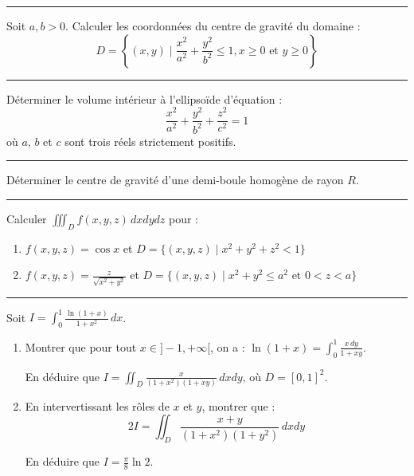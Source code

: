 \documentclass[../PolyS2.tex]{subfiles}
\begin{document}
\vspace{1em}\hrule\vspace{1em}


Soit $a, b > 0$. Calculer les coordonnées du centre de gravité du domaine :
$$D = \left\{(x,y) \mid \frac{x^2}{a^2}+\frac{y^2}{b^2} \leq 1, x \geq 0 \text{ et } y \geq 0\right\}$$

\vspace{1em}\hrule\vspace{1em}


Déterminer le volume intérieur à l'ellipsoïde d'équation :
$$\frac{x^2}{a^2}+\frac{y^2}{b^2}+\frac{z^2}{c^2} = 1$$
où $a$, $b$ et $c$ sont trois réels strictement positifs.

\vspace{1em}\hrule\vspace{1em}


Déterminer le centre de gravité d'une demi-boule homogène de rayon $R$.

\vspace{1em}\hrule\vspace{1em}


Calculer $\displaystyle\iiint_D f(x,y,z) \, dxdydz$ pour :

\begin{enumerate}
\item $f(x,y,z) = \cos x$ et $D = \{(x,y,z) \mid x^2+y^2+z^2 < 1\}$
\item $f(x,y,z) = \frac{z}{\sqrt{x^2+y^2}}$ et $D = \{(x,y,z) \mid x^2+y^2 \leq a^2 \text{ et } 0 < z < a\}$
\end{enumerate}

\vspace{1em}\hrule\vspace{1em}

\newpage 
{}

Soit $I = \displaystyle\int_0^1 \frac{\ln(1+x)}{1+x^2} \, dx$.

\begin{enumerate}
\item Montrer que pour tout $x \in ]-1, +\infty[$, on a : $\ln(1+x) = \displaystyle\int_0^1 \frac{x \, dy}{1+xy}$.

En déduire que $I = \displaystyle\iint_D \frac{x}{(1+x^2)(1+xy)} \, dxdy$, où $D = [0,1]^2$.

\item En intervertissant les rôles de $x$ et $y$, montrer que :
$$2I = \iint_D \frac{x+y}{(1+x^2)(1+y^2)} \, dxdy$$

En déduire que $I = \frac{\pi}{8}\ln 2$.
\end{enumerate}
\end{document}
